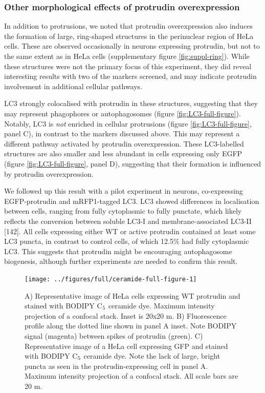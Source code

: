 \documentclass[
  12pt,
  a4paper,
]{book}
\begin{document}
\subsubsection{Other morphological effects of protrudin overexpression}\label{other-morphological-effects-of-protrudin-overexpression}

In addition to protrusions, we noted that protrudin overexpression also induces the formation of large, ring-shaped structures in the perinuclear region of HeLa cells. These are observed occasionally in neurons expressing protrudin, but not to the same extent as in HeLa cells (supplementary figure \ref{fig:suppl-ring}). While these structures were not the primary focus of this experiment, they did reveal interesting results with two of the markers screened, and may indicate protrudin involvement in additional cellular pathways.

LC3 strongly colocalised with protrudin in these structures, suggesting that they may represent phagophores or autophagosomes (figure \ref{fig:LC3-full-figure}). Notably, LC3 is \emph{not} enriched in cellular protrusions (figure \ref{fig:LC3-full-figure}, panel C), in contrast to the markers discussed above. This may represent a different pathway activated by protrudin overexpression. These LC3-labelled structures are also smaller and less abundant in cells expressing only EGFP (figure \ref{fig:LC3-full-figure}, panel D), suggesting that their formation is influenced by protrudin overexpression.

We followed up this result with a pilot experiment in neurons, co-expressing EGFP-protrudin and mRFP1-tagged LC3. LC3 showed differences in localisation between cells, ranging from fully cytoplasmic to fully punctate, which likely reflects the conversion between soluble LC3-I and membrane-associated LC3-II {[}142{]}. All cells expressing either WT or active protrudin contained at least some LC3 puncta, in contrast to control cells, of which 12.5\% had fully cytoplasmic LC3. This suggests that protrudin might be encouraging autophagosome biogenesis, although further experiments are needed to confirm this result.

\vspace{14pt}
\begin{figure}[h]
\texttt{[image: ../figures/full/ceramide-full-figure-1]} \caption[Protrudin effect on BODIPY C$\textsubscript{5}$ ceramide localisation in HeLa cells]{A) Representative image of HeLa cells expressing WT protrudin and stained with BODIPY C$\textsubscript{5}$ ceramide dye.  Maximum intensity projection of a confocal stack.  Inset is 20x20 \textmu{}m.  B) Fluorescence profile along the dotted line shown in panel A inset.  Note BODIPY signal (magenta) between spikes of protrudin (green).  C) Representative image of a HeLa cell expressing GFP and stained with BODIPY C$\textsubscript{5}$ ceramide dye.  Note the lack of large, bright puncta as seen in the protrudin-expressing cell in panel A.  Maximum intensity projection of a confocal stack.  All scale bars are 20 \textmu{}m.}\label{fig:ceramide-full-figure}
\end{figure}
\end{document}
